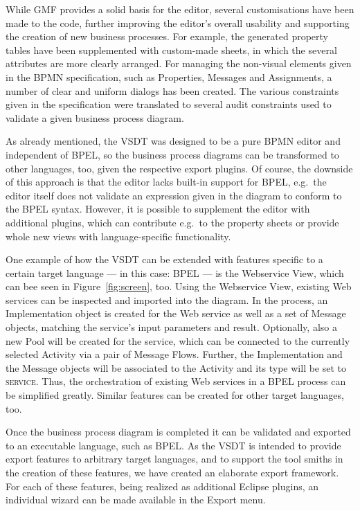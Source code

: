 While GMF provides a solid basis for the editor, several customisations have been made to the code, further improving the editor's overall usability and supporting the creation of new business processes.  For example, the generated property tables have been supplemented with custom-made sheets, in which the several attributes are more clearly arranged.  For managing the non-visual elements given in the BPMN specification, such as Properties, Messages and Assignments, a number of clear and uniform dialogs has been created.  The various constraints given in the specification were translated to several audit constraints used to validate a given business process diagram.

As already mentioned, the VSDT was designed to be a pure BPMN editor and independent of BPEL, so the business process diagrams can be transformed to other languages, too, given the respective export plugins. Of course, the downside of this approach is that the editor lacks built-in support for BPEL, e.g.\ the editor itself does not validate an expression given in the diagram to conform to the BPEL syntax.  However, it is possible to supplement the editor with additional plugins, which can contribute e.g.\ to the property sheets or provide whole new views with language-specific functionality.

One example of how the VSDT can be extended with features specific to a certain target language --- in this case: BPEL --- is the Webservice View, which can bee seen in Figure~\ref{fig:screen}, too.  Using the Webservice View, existing Web services can be inspected and imported into the diagram.  In the process, an Implementation object is created for the Web service as well as a set of Message objects, matching the service's input parameters and result. Optionally, also a new Pool will be created for the service, which can be connected to the currently selected Activity via a pair of Message Flows.  Further, the Implementation and the Message objects will be associated to the Activity and its type will be set to \textsc{service}.  Thus, the orchestration of existing Web services in a BPEL process can be simplified greatly.  Similar features can be created for other target languages, too.

Once the business process diagram is completed it can be validated and exported to an executable language, such as BPEL.  As the VSDT is intended to provide export features to arbitrary target languages, and to support the tool smiths in the creation of these features, we have created an elaborate export framework.  For each of these features, being realized as additional Eclipse plugins, an individual wizard can be made available in the Export menu.

